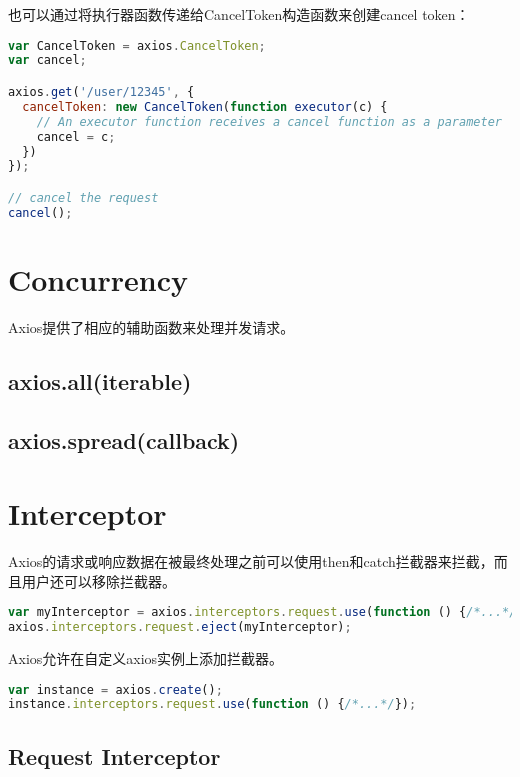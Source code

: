 也可以通过将执行器函数传递给CancelToken构造函数来创建cancel token：

\begin{lstlisting}[language=JavaScript]
var CancelToken = axios.CancelToken;
var cancel;

axios.get('/user/12345', {
  cancelToken: new CancelToken(function executor(c) {
    // An executor function receives a cancel function as a parameter
    cancel = c;
  })
});

// cancel the request
cancel();
\end{lstlisting}





\chapter{Concurrency}


Axios提供了相应的辅助函数来处理并发请求。

\section{axios.all(iterable)}



\section{axios.spread(callback)}


\chapter{Interceptor}


Axios的请求或响应数据在被最终处理之前可以使用then和catch拦截器来拦截，而且用户还可以移除拦截器。



\begin{lstlisting}[language=JavaScript]
var myInterceptor = axios.interceptors.request.use(function () {/*...*/});
axios.interceptors.request.eject(myInterceptor);
\end{lstlisting}

Axios允许在自定义axios实例上添加拦截器。

\begin{lstlisting}[language=JavaScript]
var instance = axios.create();
instance.interceptors.request.use(function () {/*...*/});
\end{lstlisting}

\section{Request Interceptor}



